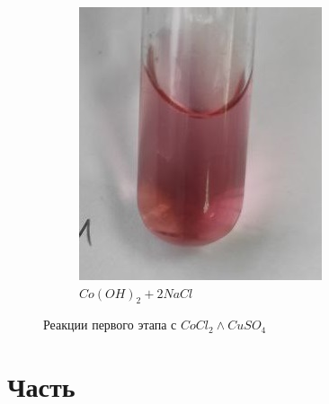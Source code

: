 \begin{figure}[h]
\begin{subfigure}[b]{0.45\textwidth}
    \includegraphics[width=\textwidth]{Ex_5/Co_1.jpg}
    \caption{$Co(OH)_2 + 2NaCl$}
    \end{subfigure}
    \caption{Реакции первого этапа с $CoCl_2 \land CuSO_4$}
\end{figure}


\section{Часть}



    

